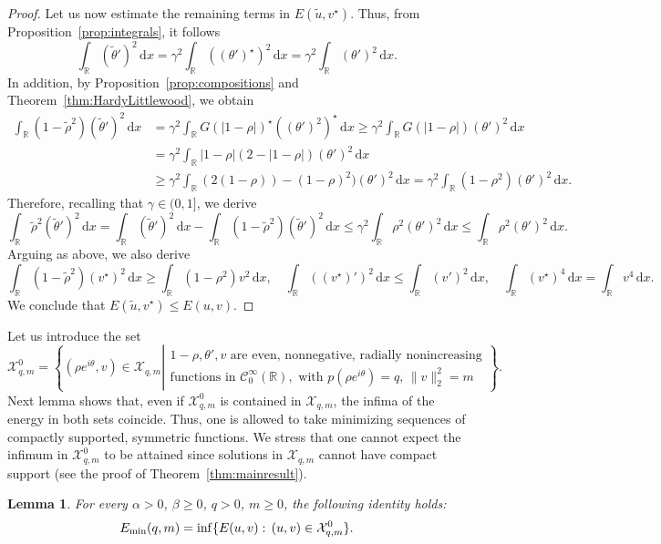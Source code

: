 \documentclass[11pt]{article}
\newcommand{\R}{\mathbb{R}}
\newcommand{\boC}{\mathcal{C}}
\newcommand{\boX}{\mathcal{X}}
\newcommand{\Emin}{E_\textup{min}}
\renewcommand{\d}{\,\mathrm{d}}
\theoremstyle{plain}
\newtheorem{lemma}[theorem]{Lemma}
\theoremstyle{definition}
\theoremstyle{remark}
\numberwithin{equation}{section}
\begin{document}
{\begin{proof}
    Let us now estimate the remaining terms in $E(\tilde u,v^\star)$. Thus, from Proposition~\ref{prop:integrals}, it follows 
    \[\int_\R(\tilde\theta')^2\d x=\gamma^2\int_\R ((\theta')^\star)^2\d x=\gamma^2\int_\R (\theta')^2\d x.\]
    In addition, by Proposition~\ref{prop:compositions} and Theorem~\ref{thm:HardyLittlewood}, we obtain
    \begin{align*}
        \int_\R(1-\tilde\rho^2)(\tilde\theta')^2\d x&=\gamma^2\int_\R  G(|1-\rho|)^\star((\theta')^2)^\star \d x\geq \gamma^2\int_\R  G(|1-\rho|)(\theta')^2\d x
        \\
        &=\gamma^2\int_\R|1-\rho|(2-|1-\rho|)(\theta')^2\d x
        \\
        &\geq\gamma^2\int_\R(2(1-\rho))-(1-\rho)^2)(\theta')^2\d x=\gamma^2\int_\R(1-\rho^2)(\theta')^2\d x.
    \end{align*}
    Therefore, recalling that $\gamma\in(0,1]$, we derive
    \begin{equation*}
        \int_\R\tilde\rho^2(\tilde\theta')^2\d x=\int_\R(\tilde\theta')^2\d x - \int_\R(1-\tilde\rho^2)(\tilde\theta')^2\d x\leq \gamma^2\int_\R\rho^2(\theta')^2\d x\leq\int_\R\rho^2(\theta')^2\d x.
    \end{equation*}
    Arguing as above, we also derive
    \[\int_\R(1-\tilde\rho^2)(v^\star)^2\d x\geq \int_\R(1-\rho^2)v^2\d x,\quad \int_\R ((v^\star)')^2\d x\leq\int_\R (v')^2\d x,\quad \int_\R (v^\star)^4\d x=\int_\R v^4\d x.\]
    We conclude that $E(\tilde u,v^\star)\leq E(u,v)$.
\end{proof}


Let us introduce the set
\[\boX^0_{q,m}=\left\{(\rho e^{i\theta},v)\in\boX_{q,m}\left|\begin{array}{l} 1-\rho,\theta',v \text{ are even, nonnegative, radially nonincreasing}\\ \text{functions in } \boC_0^\infty(\R),\text{ with } p(\rho e^{i\theta})=q,\, \|v\|^2_2=m\end{array}\right.\right\}.\]
Next lemma shows that, even if $\boX_{q,m}^0$ is contained in $\boX_{q,m}$, the infima of the energy in both sets coincide. Thus, one is allowed to take minimizing sequences of compactly supported, symmetric functions. We stress that one cannot expect the infimum in $\boX_{q,m}^0$ to be attained since solutions in $\boX_{q,m}$ cannot have compact support (see the proof of Theorem~\ref{thm:mainresult}).

\begin{lemma}\label{lemma:sameinf}
    For every $\alpha>0$, $\beta\geq 0$, $q>0$, $m\geq 0$, the following identity holds: \[\Emin(q,m)=\inf\{E(u,v):\, (u,v)\in \boX^0_{q,m}\}.\]
\end{lemma}

}
\end{document}
